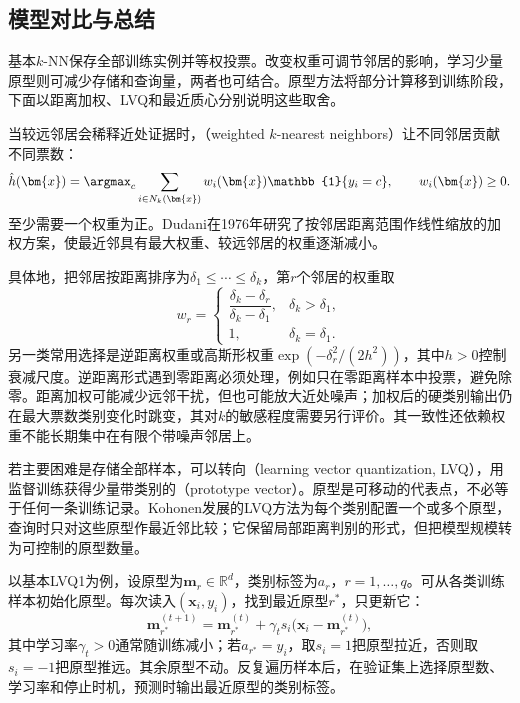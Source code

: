 \subsection{模型对比与总结}
\label{sec:classification-instances-comparison}

基本$k$-NN保存全部训练实例并等权投票。改变权重可调节邻居的影响，学习少量原型则可减少存储和查询量，两者也可结合。原型方法将部分计算移到训练阶段，下面以距离加权、LVQ和最近质心分别说明这些取舍。

当较远邻居会稀释近处证据时，（weighted $k$-nearest neighbors）让不同邻居贡献不同票数：
\begin{equation}
  \hat h(\bm{x})=\argmax_c
  \sum_{i\in N_k(\bm{x})}
  w_i(\bm{x})\mathbb{1}\{y_i=c\},
  \qquad w_i(\bm{x})\geq0.
  \label{eq:classification-weighted-knn}
\end{equation}
至少需要一个权重为正。Dudani在1976年研究了按邻居距离范围作线性缩放的加权方案，使最近邻具有最大权重、较远邻居的权重逐渐减小。

具体地，把邻居按距离排序为$\delta_1\leq\cdots\leq\delta_k$，第$r$个邻居的权重取
\begin{equation}
  w_r=
  \begin{cases}
    \dfrac{\delta_k-\delta_r}{\delta_k-\delta_1},
      & \delta_k>\delta_1,\\[4pt]
    1, & \delta_k=\delta_1.
  \end{cases}
  \label{eq:classification-dudani-weights}
\end{equation}
另一类常用选择是逆距离权重或高斯形权重$\exp(-\delta_r^2/(2h^2))$，其中$h>0$控制衰减尺度。逆距离形式遇到零距离必须处理，例如只在零距离样本中投票，避免除零。距离加权可能减少远邻干扰，但也可能放大近处噪声；加权后的硬类别输出仍在最大票数类别变化时跳变，其对$k$的敏感程度需要另行评价。其一致性还依赖权重不能长期集中在有限个带噪声邻居上。

若主要困难是存储全部样本，可以转向（learning vector quantization, LVQ），用监督训练获得少量带类别的（prototype vector）。原型是可移动的代表点，不必等于任何一条训练记录。Kohonen发展的LVQ方法为每个类别配置一个或多个原型，查询时只对这些原型作最近邻比较；它保留局部距离判别的形式，但把模型规模转为可控制的原型数量。

以基本LVQ1为例，设原型为$\bm{m}_r\in\mathbb{R}^d$，类别标签为$a_r$，$r=1,\ldots,q$。可从各类训练样本初始化原型。每次读入$(\bm{x}_i,y_i)$，找到最近原型$r^\ast$，只更新它：
\begin{equation}
  \bm{m}_{r^\ast}^{(t+1)}
  =\bm{m}_{r^\ast}^{(t)}
   +\gamma_t s_i
    \bigl(\bm{x}_i-\bm{m}_{r^\ast}^{(t)}\bigr),
  \label{eq:classification-lvq-update}
\end{equation}
其中学习率$\gamma_t>0$通常随训练减小；若$a_{r^\ast}=y_i$，取$s_i=1$把原型拉近，否则取$s_i=-1$把原型推远。其余原型不动。反复遍历样本后，在验证集上选择原型数、学习率和停止时机，预测时输出最近原型的类别标签。

